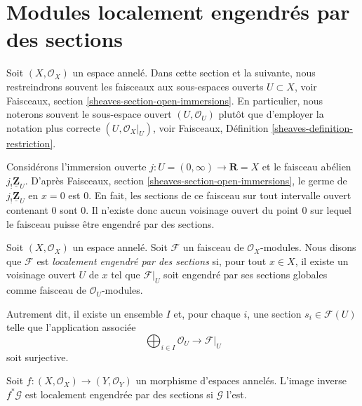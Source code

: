 \section{Modules localement engendrés par des sections}
\label{section-locally-generated}

\noindent
Soit $(X, \mathcal{O}_X)$ un espace annelé. Dans cette section et la suivante,
nous restreindrons souvent les faisceaux aux sous-espaces ouverts
$U \subset X$, voir Faisceaux, section
\ref{sheaves-section-open-immersions}. En particulier, nous noterons souvent
le sous-espace ouvert $(U, \mathcal{O}_U)$ plutôt que d'employer la notation
plus correcte $(U, \mathcal{O}_X|_U)$, voir Faisceaux, Définition
\ref{sheaves-definition-restriction}.

\medskip\noindent
Considérons l'immersion ouverte
$j : U = (0 , \infty) \to \mathbf{R} = X$ et le faisceau abélien
$j_!\underline{\mathbf{Z}}_U$. D'après Faisceaux, section
\ref{sheaves-section-open-immersions}, le germe de
$j_!\underline{\mathbf{Z}}_U$ en $x = 0$ est $0$. En fait, les sections de ce
faisceau sur tout intervalle ouvert contenant $0$ sont $0$. Il n'existe donc
aucun voisinage ouvert du point $0$ sur lequel le faisceau puisse être engendré
par des sections.

\begin{definition}
\label{definition-locally-generated}
Soit $(X, \mathcal{O}_X)$ un espace annelé. Soit $\mathcal{F}$ un faisceau de
$\mathcal{O}_X$-modules. Nous disons que $\mathcal{F}$ est
{\it localement engendré par des sections} si, pour tout $x \in X$, il existe
un voisinage ouvert $U$ de $x$ tel que $\mathcal{F}|_U$ soit engendré par ses
sections globales comme faisceau de $\mathcal{O}_U$-modules.
\end{definition}

\noindent
Autrement dit, il existe un ensemble $I$ et, pour chaque $i$, une section
$s_i \in \mathcal{F}(U)$ telle que l'application associée
$$
\bigoplus\nolimits_{i \in I} \mathcal{O}_U
\longrightarrow
\mathcal{F}|_U
$$
soit surjective.

\begin{lemma}
\label{lemma-pullback-locally-generated}
Soit $f : (X, \mathcal{O}_X) \to (Y, \mathcal{O}_Y)$ un morphisme d'espaces
annelés. L'image inverse $f^*\mathcal{G}$ est localement engendrée par des
sections si $\mathcal{G}$ l'est.
\end{lemma}

